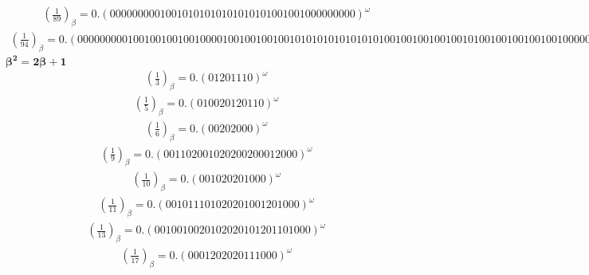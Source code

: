 \documentclass[fleqn]{article}
\begin{document}
\begin{equation*}
\begin{split}
(\frac{1}{89})_\beta = 0.(00000000010010101010101010101001001000000000)^\omega
\end{split}\end{equation*}
\begin{equation*}
\begin{split}
(\frac{1}{94})_\beta = 0.(000000000100100100100100001001001001001010101010101010100100100100100101001001001001001000000000)^\omega
\end{split}\end{equation*}
$\boldsymbol{\beta^2 = 2\beta + 1}$
\begin{equation*}
\begin{split}
(\frac{1}{3})_\beta = 0.(01201110)^\omega
\end{split}\end{equation*}
\begin{equation*}
\begin{split}
(\frac{1}{5})_\beta = 0.(010020120110)^\omega
\end{split}\end{equation*}
\begin{equation*}
\begin{split}
(\frac{1}{6})_\beta = 0.(00202000)^\omega
\end{split}\end{equation*}
\begin{equation*}
\begin{split}
(\frac{1}{9})_\beta = 0.(001102001020200200012000)^\omega
\end{split}\end{equation*}
\begin{equation*}
\begin{split}
(\frac{1}{10})_\beta = 0.(001020201000)^\omega
\end{split}\end{equation*}
\begin{equation*}
\begin{split}
(\frac{1}{11})_\beta = 0.(001011101020201001201000)^\omega
\end{split}\end{equation*}
\begin{equation*}
\begin{split}
(\frac{1}{13})_\beta = 0.(0010010020102020101201101000)^\omega
\end{split}\end{equation*}
\begin{equation*}
\begin{split}
(\frac{1}{17})_\beta = 0.(0001202020111000)^\omega
\end{split}\end{equation*}
\end{document}
